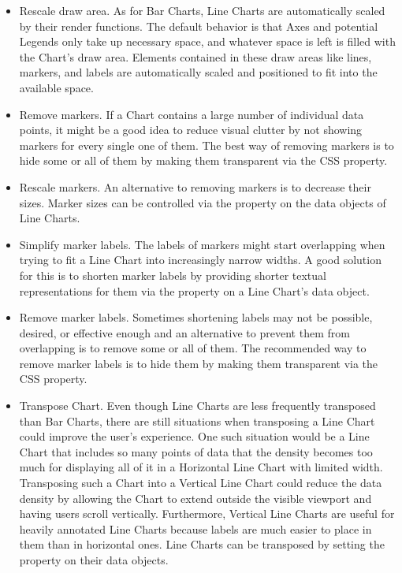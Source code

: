 \begin{itemize}

\item
Rescale draw area.
As for Bar Charts, Line Charts are automatically scaled by their render functions.
The default behavior is that Axes and potential Legends only take up necessary space, and whatever space is left is filled with the Chart's draw area.
Elements contained in these draw areas like lines, markers, and labels are automatically scaled and positioned to fit into the available space.

\item
Remove markers.
If a Chart contains a large number of individual data points, it might be a good idea to reduce visual clutter by not showing markers for every single one of them.
The best way of removing markers is to hide some or all of them by making them transparent via the CSS  property.

\item
Rescale markers.
An alternative to removing markers is to decrease their sizes.
Marker sizes can be controlled via the  property on the data objects of Line Charts.

\item
Simplify marker labels.
The labels of markers might start overlapping when trying to fit a Line Chart into increasingly narrow widths.
A good solution for this is to shorten marker labels by providing shorter textual representations for them via the  property on a Line Chart's data object.

\item
Remove marker labels.
Sometimes shortening labels may not be possible, desired, or effective enough and an alternative to prevent them from overlapping is to remove some or all of them.
The recommended way to remove marker labels is to hide them by making them transparent via the CSS  property.

\item
Transpose Chart.
Even though Line Charts are less frequently transposed than Bar Charts, there are still situations when transposing a Line Chart could improve the user's experience.
One such situation would be a Line Chart that includes so many points of data that the density becomes too much for displaying all of it in a Horizontal Line Chart with limited width.
Transposing such a Chart into a Vertical Line Chart could reduce the data density by allowing the Chart to extend outside the visible viewport and having users scroll vertically.
Furthermore, Vertical Line Charts are useful for heavily annotated Line Charts because labels are much easier to place in them than in horizontal ones.
Line Charts can be transposed by setting the  property on their data objects.


\end{itemize}
